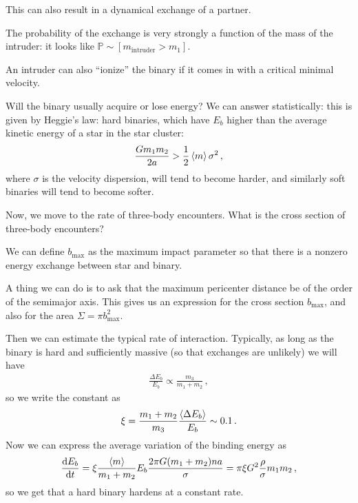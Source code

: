 \documentclass[main.tex]{subfiles}
\begin{document}
This can also result in a dynamical exchange of a partner. 

The probability of the exchange is very strongly a function of the mass of the intruder: it looks like \(\mathbb{P} \sim [m _{\text{intruder}} > m_1 ]\). 

An intruder can also ``ionize'' the binary if it comes in with a critical minimal velocity. 

Will the binary usually acquire or lose energy? 
We can answer statistically: this is given by Heggie's law: hard binaries, which have \(E_b\) higher than the average kinetic energy of a star in the star cluster: 
%
\begin{align}
\frac{G m_1 m_2 }{2a} > \frac{1}{2} \expval{m} \sigma^2
\,,
\end{align}
%
where \(\sigma \) is the velocity dispersion, will tend to become harder, and similarly soft binaries will tend to become softer. 

Now, we move to the rate of three-body encounters. 
What is the cross section of three-body encounters? 

We can define \(b _{\text{max}} \) as the maximum impact parameter so that there is a nonzero energy exchange between star and binary. 

A thing we can do is to ask that the maximum pericenter distance be of the order of the semimajor axis. 
This gives us an expression  for the cross section \(b _{\text{max}}\), and also for the area \(\Sigma = \pi b _{\text{max}}^2\). 

Then we can estimate the typical rate of interaction. 
Typically, as long as the binary is hard and sufficiently massive (so that exchanges are unlikely) we will have 
%
\begin{align}
\frac{ \Delta E_b}{E_b} \propto \frac{m_3}{m_1 + m_2 }
\,,
\end{align}
%
so we write the constant as 
%
\begin{align}
\xi = \frac{m_1 +m_2 }{m_3 } \frac{\expval{\Delta E_b}}{E_b} \sim \num{.1}
\,.
\end{align}
%
Now we can express the average variation of the binding energy as 
%
\begin{align}
\dv{E_b}{t} = \xi \frac{\expval{m}}{m_1 + m_2 } E_b \frac{2 \pi G (m_1 + m_2 ) na}{\sigma } = \pi \xi G^2 \frac{\rho}{\sigma } m_1 m_2 
\,,
\end{align}
%
so we get that a hard binary hardens at a constant rate. 
\end{document}
